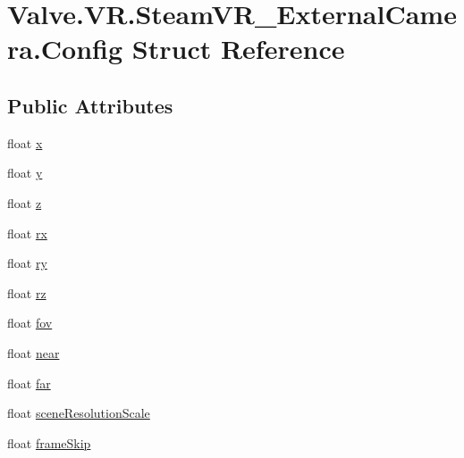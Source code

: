\hypertarget{struct_valve_1_1_v_r_1_1_steam_v_r___external_camera_1_1_config}{}\section{Valve.\+V\+R.\+Steam\+V\+R\+\_\+\+External\+Camera.\+Config Struct Reference}
\label{struct_valve_1_1_v_r_1_1_steam_v_r___external_camera_1_1_config}
\subsection*{Public Attributes}
\begin{DoxyCompactItemize}
\item 
float \mbox{\hyperlink{struct_valve_1_1_v_r_1_1_steam_v_r___external_camera_1_1_config_a6259b88cd56a3e47f6167f0980314959}{x}}
\item 
float \mbox{\hyperlink{struct_valve_1_1_v_r_1_1_steam_v_r___external_camera_1_1_config_a63e4f35905e824136faf2a28c83723bb}{y}}
\item 
float \mbox{\hyperlink{struct_valve_1_1_v_r_1_1_steam_v_r___external_camera_1_1_config_af38470d47453046c727eba474ad594ea}{z}}
\item 
float \mbox{\hyperlink{struct_valve_1_1_v_r_1_1_steam_v_r___external_camera_1_1_config_a04be9c5ca9f3e0d9fc67bc4c5dd9600c}{rx}}
\item 
float \mbox{\hyperlink{struct_valve_1_1_v_r_1_1_steam_v_r___external_camera_1_1_config_a9b3dbe0ad452411082af7c1f684bf1fa}{ry}}
\item 
float \mbox{\hyperlink{struct_valve_1_1_v_r_1_1_steam_v_r___external_camera_1_1_config_a07e70bc7d9c63124229d81427bcb2ca0}{rz}}
\item 
float \mbox{\hyperlink{struct_valve_1_1_v_r_1_1_steam_v_r___external_camera_1_1_config_a080da4535ee5ec8ddf0548d22923e64e}{fov}}
\item 
float \mbox{\hyperlink{struct_valve_1_1_v_r_1_1_steam_v_r___external_camera_1_1_config_aee32c38c5425e621f95a3d81fa3ecbef}{near}}
\item 
float \mbox{\hyperlink{struct_valve_1_1_v_r_1_1_steam_v_r___external_camera_1_1_config_a330734ac7b0317a49efe950a8fe138f1}{far}}
\item 
float \mbox{\hyperlink{struct_valve_1_1_v_r_1_1_steam_v_r___external_camera_1_1_config_adb76fad65392048d06c24cad3082dd09}{scene\+Resolution\+Scale}}
\item 
float \mbox{\hyperlink{struct_valve_1_1_v_r_1_1_steam_v_r___external_camera_1_1_config_a8bd467f8847a89ca6e863792d7d88b45}{frame\+Skip}}

\end{DoxyCompactItemize}
